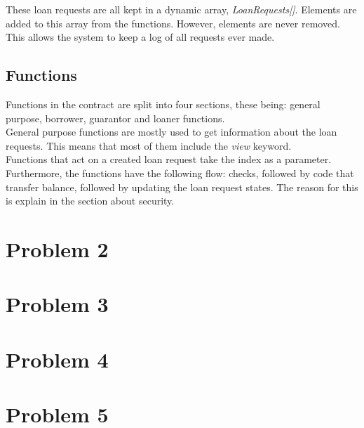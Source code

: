 \documentclass[a4paper, 12pt]{article}
\begin{document}
These loan requests are all kept in a dynamic array, \textit{LoanRequests[]}. Elements are added to this array from the functions. However, elements are never removed. This allows the system to keep a log of all requests ever made.

\subsection{Functions}

Functions in the contract are split into four sections, these being: general purpose, borrower, guarantor and loaner functions.
\\
General purpose functions are mostly used to get information about the loan requests. This means that most of them include the \textit{view} keyword.
\\
Functions that act on a created loan request take the index as a parameter. Furthermore, the functions have the following flow: checks, followed by code that transfer balance, followed by updating the loan request states. The reason for this is explain in the section about security. 



\section{Problem 2}
\section{Problem 3}
\section{Problem 4}
\section{Problem 5}

%
\end{document}
